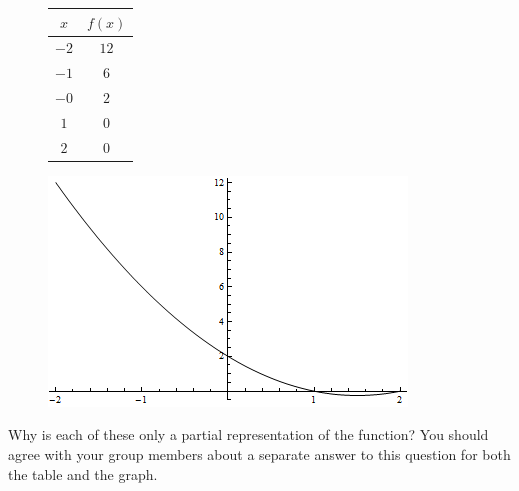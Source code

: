 \documentclass[11pt]{amsart}
\begin{document}
\begin{figure}[ht]
\begin{minipage}[b]{0.45\linewidth}
\begin{center}
\begin{tabular}{|c|c|}
\hline
$x$& $f(x)$  \\ \hline
$-2$ & $12$      \\ \hline
$-1$ & $6$  \\ \hline
$-0$ & $2$  \\ \hline
$1$  & $0$  \\ \hline
$2$  & $0$  \\ \hline
\end{tabular}
\end{center}
\end{minipage}
\hspace{0.5cm}
\begin{minipage}[b]{0.45\linewidth}
\begin{center}
\includegraphics[width=\textwidth]{ch11se01-fig1}
\end{center}
\end{minipage}
\end{figure}
\begin{discussionquestion}
Why is each of these only a partial representation of the function? You should agree with your group members about a separate answer to this question for both the table and the graph.
\end{discussionquestion}
\end{document}
